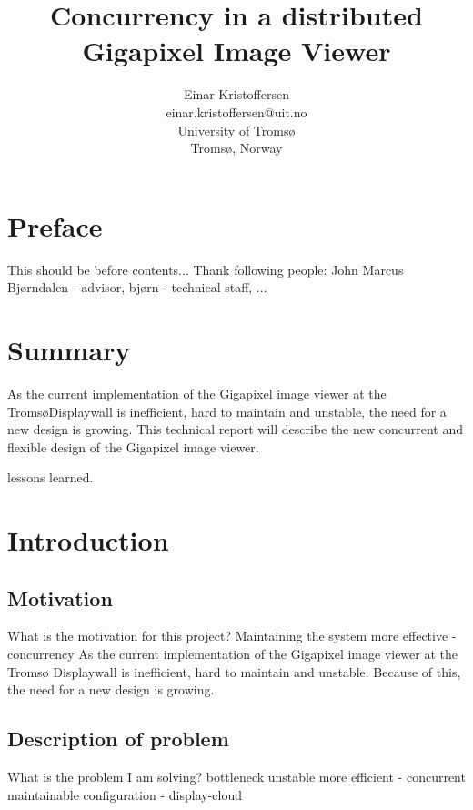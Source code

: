 \documentclass[12pt, a4paper, oneside]{article}
\begin{document}
\title{\bfseries {Concurrency in a distributed \\Gigapixel Image Viewer}}
\author{Einar Kristoffersen \\
einar.kristoffersen@uit.no\\
University of Troms\o\\
Troms\o, Norway}
\date{}

\maketitle

%
\newpage
\tableofcontents
\newpage


\section{Preface}
This should be before contents...
Thank following people:
John Marcus Bjørndalen - advisor, 
bjørn - technical staff,
...


\section{Summary}
As the current implementation of the Gigapixel image viewer at the Troms\o Displaywall is inefficient, hard to maintain and unstable, the need for a new design is growing. This technical report will describe the new concurrent and flexible design of the Gigapixel image viewer.

lessons learned.

\section{Introduction}
\subsection{Motivation}
What is the motivation for this project?
Maintaining the system
more effective - concurrency
As the current implementation of the Gigapixel image viewer at the Tromsø Displaywall is inefficient, hard to maintain and unstable. Because of this, the need for a new design is growing.  

\subsection{Description of problem}
What is the problem I am solving?
bottleneck
unstable
more efficient - concurrent
maintainable
configuration - display-cloud
\end{document}
